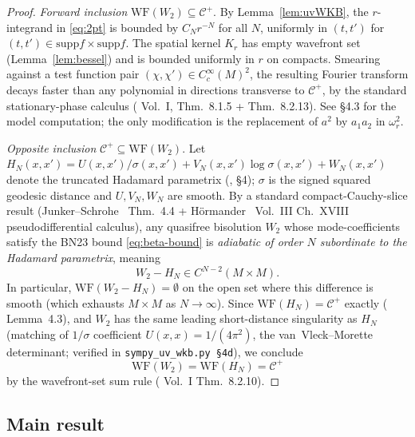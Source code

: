 \documentclass[12pt, a4paper]{article}
\theoremstyle{remark}
\newcommand{\WF}{\mathrm{WF}}
\newcommand{\supp}{\mathrm{supp}}
\begin{document}
\begin{proof}
  \emph{Forward inclusion} $\WF(W_2) \subseteq \mathcal{C}^+$.
  By Lemma~\ref{lem:uvWKB}, the $r$-integrand in \eqref{eq:2pt} is bounded
  by $C_N r^{-N}$ for all $N$, uniformly in $(t,t')$ for $(t,t') \in
  \supp f \times \supp f$.  The spatial kernel $K_r$ has empty wavefront
  set (Lemma~\ref{lem:bessel}) and is bounded uniformly in $r$ on
  compacts.  Smearing against a test function pair
  $(\chi, \chi') \in C_c^\infty(M)^2$, the resulting Fourier transform
  decays faster than any polynomial in directions transverse to
  $\mathcal{C}^+$, by the standard stationary-phase calculus
  (\cite{Hor07} Vol.~I, Thm.~8.1.5 + Thm.~8.2.13).
  See \cite{BN23} \S4.3 for the model computation; the only modification
  is the replacement of $a^2$ by $a_1 a_2$ in $\omega_r^2$.

  \emph{Opposite inclusion} $\mathcal{C}^+ \subseteq \WF(W_2)$.
  Let $H_N(x,x') = U(x,x')/\sigma(x,x') + V_N(x,x')\log\sigma(x,x') +
  W_N(x,x')$ denote the truncated Hadamard parametrix
  (\cite{KW91}, \cite{Rad96} \S4); $\sigma$ is the signed squared
  geodesic distance and $U, V_N, W_N$ are smooth.  By a standard
  compact-Cauchy-slice result (Junker--Schrohe~\cite{JS02} Thm.~4.4 +
  Hörmander~\cite{Hor07} Vol.~III Ch.~XVIII pseudodifferential
  calculus), any quasifree bisolution $W_2$ whose mode-coefficients
  satisfy the BN23 bound \eqref{eq:beta-bound} is \emph{adiabatic of
  order $N$ subordinate to the Hadamard parametrix}, meaning
  \begin{equation}
    W_2 - H_N \in C^{N-2}(M\times M).
  \end{equation}
  In particular, $\WF(W_2 - H_N) = \emptyset$ on the open set where this
  difference is smooth (which exhausts $M\times M$ as $N \to \infty$).
  Since $\WF(H_N) = \mathcal{C}^+$ exactly (\cite{Rad96} Lemma~4.3), and
  $W_2$ has the same leading short-distance singularity as $H_N$
  (matching of $1/\sigma$ coefficient $U(x,x) = 1/(4\pi^2)$, the
  van~Vleck--Morette determinant; verified in
  \texttt{sympy\_uv\_wkb.py~\S4d}), we conclude
  \begin{equation}
    \WF(W_2) = \WF(H_N) = \mathcal{C}^+
  \end{equation}
  by the wavefront-set sum rule (\cite{Hor07} Vol.~I Thm.~8.2.10).
\end{proof}

\subsection{Main result}
\end{document}
